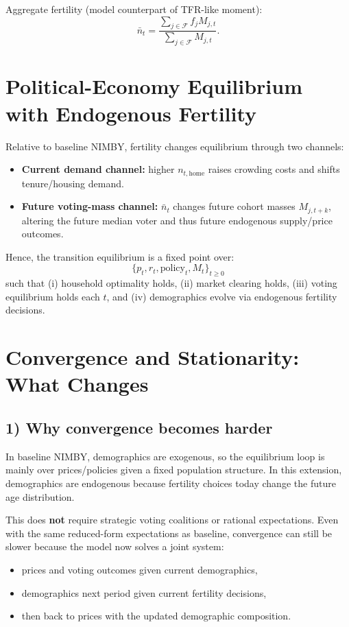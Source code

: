 \documentclass[11pt]{article}
\begin{document}
Aggregate fertility (model counterpart of TFR-like moment):
\begin{equation}
\bar n_t = \frac{\sum_{j\in\mathcal F} f_j M_{j,t}}{\sum_{j\in\mathcal F} M_{j,t}}.
\end{equation}

\section{Political-Economy Equilibrium with Endogenous Fertility}

Relative to baseline NIMBY, fertility changes equilibrium through two channels:
\begin{itemize}
\item \textbf{Current demand channel:} higher $n_{t,\text{home}}$ raises crowding costs and shifts tenure/housing demand.
\item \textbf{Future voting-mass channel:} $\bar n_t$ changes future cohort masses $M_{j,t+k}$, altering the future median voter and thus future endogenous supply/price outcomes.
\end{itemize}

Hence, the transition equilibrium is a fixed point over:
\begin{equation}
\{p_t,r_t,\text{policy}_t,M_t\}_{t\ge0}
\end{equation}
such that (i) household optimality holds, (ii) market clearing holds, (iii) voting equilibrium holds each $t$, and (iv) demographics evolve via endogenous fertility decisions.

\section{Convergence and Stationarity: What Changes}

\subsection*{1) Why convergence becomes harder}
In baseline NIMBY, demographics are exogenous, so the equilibrium loop is mainly over prices/policies given a fixed population structure. In this extension, demographics are endogenous because fertility choices today change the future age distribution.

This does \textbf{not} require strategic voting coalitions or rational expectations. Even with the same reduced-form expectations as baseline, convergence can still be slower because the model now solves a joint system:
\begin{itemize}
\item prices and voting outcomes given current demographics,
\item demographics next period given current fertility decisions,
\item then back to prices with the updated demographic composition.
\end{itemize}
\end{document}
